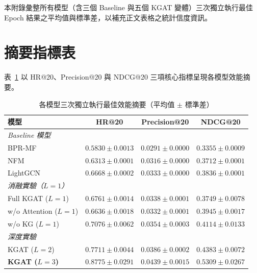 
\label{app:performance_stats}

本附錄彙整所有模型（含三個 Baseline 與五個 KGAT 變體）三次獨立執行最佳 Epoch 結果之平均值與標準差，以補充正文表格之統計信度資訊。

\section{摘要指標表}

表~\ref{tab:best_summary} 以 HR@20、Precision@20 與 NDCG@20 三項核心指標呈現各模型效能摘要。

\begin{table}[htbp]
  \centering
  \footnotesize
  \setlength{\tabcolsep}{3pt}
  \caption{各模型三次獨立執行最佳效能摘要（平均值 $\pm$ 標準差）}
  \label{tab:best_summary}
  \begin{tabular}{l ccc}
    \toprule
    模型 & HR@20 & Precision@20 & NDCG@20 \\
    \midrule
    \multicolumn{4}{l}{\textit{Baseline 模型}} \\
    BPR-MF & $0.5830 \pm 0.0013$ & $0.0291 \pm 0.0000$ & $0.3355 \pm 0.0009$ \\
    NFM & $0.6313 \pm 0.0001$ & $0.0316 \pm 0.0000$ & $0.3712 \pm 0.0001$ \\
    LightGCN & $0.6668 \pm 0.0002$ & $0.0333 \pm 0.0000$ & $0.3836 \pm 0.0001$ \\
    \midrule
    \multicolumn{4}{l}{\textit{消融實驗（$L{=}1$）}} \\
    Full KGAT ($L{=}1$) & $0.6761 \pm 0.0014$ & $0.0338 \pm 0.0001$ & $0.3749 \pm 0.0078$ \\
    w/o Attention ($L{=}1$) & $0.6636 \pm 0.0018$ & $0.0332 \pm 0.0001$ & $0.3945 \pm 0.0017$ \\
    w/o KG ($L{=}1$) & $0.7076 \pm 0.0062$ & $0.0354 \pm 0.0003$ & $0.4114 \pm 0.0133$ \\
    \midrule
    \multicolumn{4}{l}{\textit{深度實驗}} \\
    KGAT ($L{=}2$) & $0.7711 \pm 0.0044$ & $0.0386 \pm 0.0002$ & $0.4383 \pm 0.0072$ \\
    \textbf{KGAT ($L{=}3$)} & $\mathbf{0.8775 \pm 0.0291}$ & $\mathbf{0.0439 \pm 0.0015}$ & $\mathbf{0.5309 \pm 0.0267}$ \\
    \bottomrule
  \end{tabular}
\end{table}

